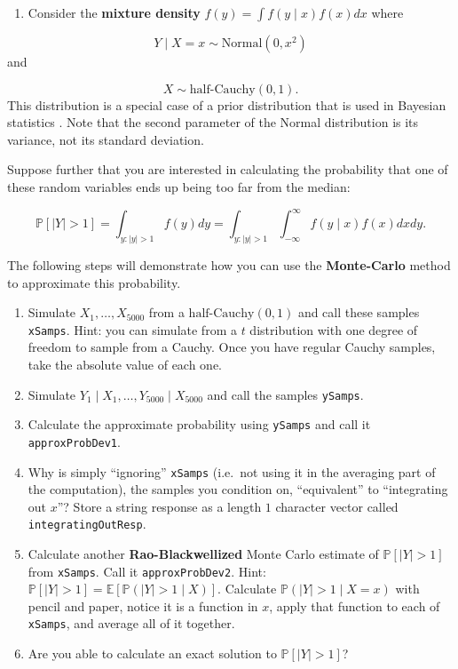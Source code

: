 \documentclass[12pt,krantz2]{krantz}
\providecommand{\tightlist}{%
  \setlength{\itemsep}{0pt}\setlength{\parskip}{0pt}}
\begin{document}
\begin{enumerate}
\def\labelenumi{\arabic{enumi}.}
\setcounter{enumi}{5}
\tightlist
\item
  Consider the \textbf{mixture density} \(f(y) = \int f(y \mid x) f(x) dx\) where
\end{enumerate}

\begin{equation} 
Y \mid X = x \sim \text{Normal}(0, x^2)
\end{equation}
and

\begin{equation} 
X \sim \text{half-Cauchy}(0, 1).
\end{equation}
This distribution is a special case of a prior distribution that is used in Bayesian statistics \citep{horseshoe}. Note that the second parameter of the Normal distribution is its variance, not its standard deviation.

Suppose further that you are interested in calculating the probability that one of these random variables ends up being too far from the median:

\begin{equation} 
\mathbb{P}[|Y| > 1] = \int_{y : |y| > 1} f(y)dy = \int_{y : |y| > 1} \int_{-\infty}^\infty  f(y \mid x) f(x) dx dy.
\end{equation}

The following steps will demonstrate how you can use the \textbf{Monte-Carlo} \citep{monte-carlo-stat-methods} method to approximate this probability.

\begin{enumerate}
\def\labelenumi{\alph{enumi}.}
\item
  Simulate \(X_1, \ldots, X_{5000}\) from a \(\text{half-Cauchy}(0, 1)\) and call these samples \texttt{xSamps}. Hint: you can simulate from a \(t\) distribution with one degree of freedom to sample from a Cauchy. Once you have regular Cauchy samples, take the absolute value of each one.
\item
  Simulate \(Y_1 \mid X_1, \ldots, Y_{5000} \mid X_{5000}\) and call the samples \texttt{ySamps}.
\item
  Calculate the approximate probability using \texttt{ySamps} and call it \texttt{approxProbDev1}.
\item
  Why is simply ``ignoring'' \texttt{xSamps} (i.e.~not using it in the averaging part of the computation), the samples you condition on, ``equivalent'' to ``integrating out \(x\)''? Store a string response as a length \(1\) character vector called \texttt{integratingOutResp}.
\item
  Calculate another \textbf{Rao-Blackwellized} Monte Carlo estimate of \(\mathbb{P}[|Y| > 1]\) from \texttt{xSamps}. Call it \texttt{approxProbDev2}. Hint: \(\mathbb{P}[|Y| > 1] = \mathbb{E}[\mathbb{P}(|Y| > 1 \mid X) ]\). Calculate \(\mathbb{P}(|Y| > 1 \mid X=x)\) with pencil and paper, notice it is a function in \(x\), apply that function to each of \texttt{xSamps}, and average all of it together.
\item
  Are you able to calculate an exact solution to \(\mathbb{P}[|Y| > 1]\)?
\end{enumerate}
\end{document}
